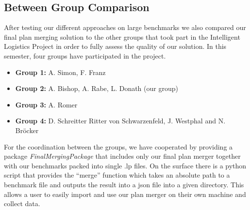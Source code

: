 \documentclass{llncs}
\begin{document}
\subsection{Between Group Comparison}
After testing our different approaches on large benchmarks we also compared our final plan merging solution to the other groups that took part in the Intelligent Logistics Project in order to fully assess the quality of our solution. In this semester, four groups have participated in the project.
\begin{itemize}
    \item \textbf{Group 1:} A. Simon, F. Franz\cite{project2}
    \item \textbf{Group 2:} A. Bishop, A. Rabe, L. Donath (our group)\cite{project1}
    \item \textbf{Group 3:} A. Romer\cite{project3}
    \item \textbf{Group 4:} D. Schreitter Ritter von Schwarzenfeld, J. Westphal and N. Bröcker\cite{project4}
\end{itemize}

For the coordination between the groups, we have cooperated by providing a package \emph{FinalMergingPackage}\cite{project1} that includes only our final plan merger together with our benchmarks packed into single .lp files. On the surface there is a python script that provides the ``merge'' function which takes an absolute path to a benchmark file and outputs the result into a json file into a given directory. This allows a user to easily import and use our plan merger on their own machine and collect data.
\end{document}
